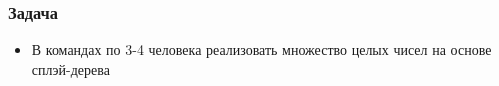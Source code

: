 \documentclass{../../slides-style}
\begin{document}
    \begin{frame}[plain]
        \titlepage
    \end{frame}

    \begin{frame}
        \frametitle{Задача}
        \begin{itemize}
            \item В командах по 3-4 человека реализовать множество целых чисел на основе сплэй-дерева
        \end{itemize}
    \end{frame}
\end{document}
